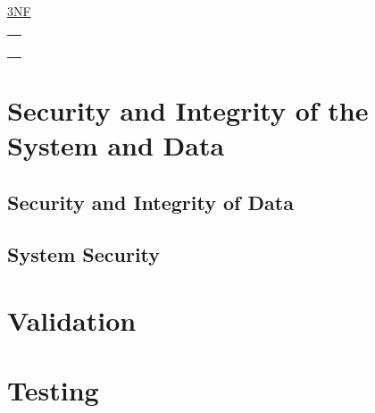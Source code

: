 \underline{3NF}
\begin{table}[H]
\begin{tabular}{|l|}
\hline
\\
\\
\\
\\
\hline
\end{tabular}
\end{table}
\section{Security and Integrity of the System and Data}

\subsection{Security and Integrity of Data}

\subsection{System Security}

\section{Validation}

\section{Testing}

